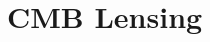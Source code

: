  
\chapter{CMB Lensing}

\bigskip


\def\nnu{N_{\mathrm eff}}
\def\gtrsim{\raise-.75ex\hbox{$\buildrel>\over\sim$}}

